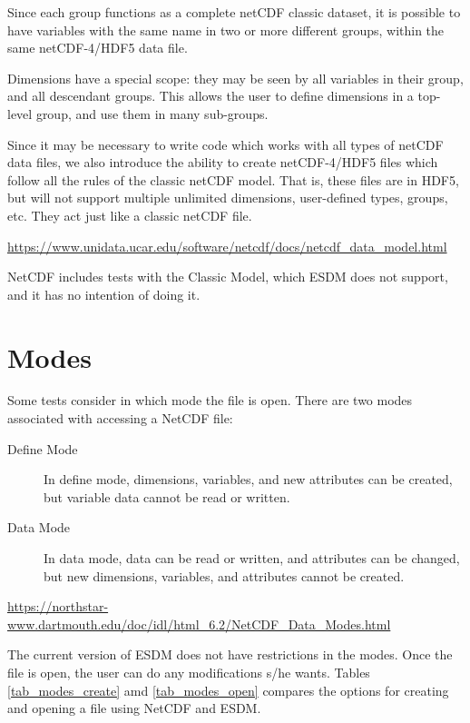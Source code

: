\begin{framed}
Since each group functions as a complete netCDF classic dataset, it is possible to have variables with the same name in two or more different groups, within the same netCDF-4/HDF5 data file.

Dimensions have a special scope: they may be seen by all variables in their group, and all descendant groups. This allows the user to define dimensions in a top-level group, and use them in many sub-groups.

Since it may be necessary to write code which works with all types of netCDF data files, we also introduce the ability to create netCDF-4/HDF5 files which follow all the rules of the classic netCDF model. That is, these files are in HDF5, but will not support multiple unlimited dimensions, user-defined types, groups, etc. They act just like a classic netCDF file.

\url{https://www.unidata.ucar.edu/software/netcdf/docs/netcdf_data_model.html}

\end{framed}

NetCDF includes tests with the Classic Model, which ESDM does not support, and it has no intention of doing it.

\section{Modes}

\tab
\begin{framed}
Some tests consider in which mode the file is open. There are two modes associated with accessing a NetCDF file:

\begin{description}

\item[Define Mode] In define mode, dimensions, variables, and new attributes can be created, but variable data cannot be read or written.

\item[Data Mode] In data mode, data can be read or written, and attributes can be changed, but new dimensions, variables, and attributes cannot be created.

\end{description}

\url{https://northstar-www.dartmouth.edu/doc/idl/html_6.2/NetCDF_Data_Modes.html}

\end{framed}

The current version of ESDM does not have restrictions in the modes. Once the file is open, the user can do any modifications s/he wants. Tables \ref{tab_modes_create} amd \ref{tab_modes_open} compares the options for creating and opening a file using NetCDF and ESDM.

